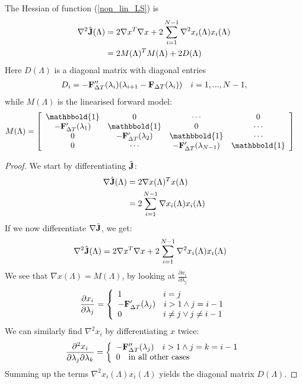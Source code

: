 \begin{proposition}\label{NonLin_prop}
The Hessian of function (\ref{non_lin_LS}) is
\begin{align*}
\nabla^2 \hat{\bold J}(\Lambda) &= 2\nabla x^T\nabla x + 2\sum_{i=1}^{N-1} \nabla^2 x_i(\Lambda) x_i(\Lambda)\\
&=2M(\Lambda)^TM(\Lambda) + 2D(\Lambda)
\end{align*}
Here $D(\Lambda)$ is a diagonal matrix with diagonal entries 
\begin{align*}
D_i=-\bold{F}_{\Delta T}''(\lambda_i)(\lambda_{i+1}-\bold F_{\Delta T}(\lambda_i)) \quad i=1,...,N-1,
\end{align*}
while $M(\Lambda)$ is the linearised forward model:
\begin{align*}
M(\Lambda) &= \left[ \begin{array}{cccc}
   \mathbbold{1} & 0 & \cdots & 0 \\  
   -\bold{F}_{\Delta T}'(\lambda_{1}) & \mathbbold{1} & 0 & \cdots \\ 
   0 &-\bold{F}_{\Delta T}'(\lambda_{2}) & \mathbbold{1}  & \cdots \\
   0 &\cdots &-\bold{F}_{\Delta T}'(\lambda_{N-1}) & \mathbbold{1}  \\
   \end{array}  \right]
\end{align*}	
\end{proposition}
\begin{proof}
We start by differentiating $\hat{\bold J}$:
\begin{align*}
\nabla \hat{\bold J}(\Lambda) &= 2 \nabla x(\Lambda)^T x(\Lambda)\\
&=2\sum_{i=1}^{N-1} \nabla x_i(\Lambda) x_i(\Lambda)
\end{align*}
If we now differentiate $\nabla \hat{\bold J}$, we get:
\begin{align*}
\nabla^2 \hat{\bold J}(\Lambda) &= 2\nabla x^T\nabla x + 2\sum_{i=1}^{N-1} \nabla^2 x_i(\Lambda) x_i(\Lambda)
\end{align*}
We see that $\nabla x(\Lambda)=M(\Lambda)$, by looking at $\frac{\partial x_i}{\partial \lambda_j}$
\begin{align*}
\frac{\partial x_i}{\partial \lambda_j} = \left\{
     \begin{array}{lr}
		1 \quad\quad\quad\quad\quad i=j\\
		-\bold F_{\Delta T}'(\lambda_{j}) \quad i>1 \wedge j=i-1 \\
		0 \quad\quad\quad\quad\quad i\neq j \vee j\neq i-1
	\end{array}
   \right.	
\end{align*}
We can similarly find $\nabla^2 x_i$ by differentiating $x$ twice:
\begin{align*}
\frac{\partial^2 x_i}{\partial \lambda_j\partial\lambda_k} = \left\{
     \begin{array}{lr}
		-\bold F_{\Delta T}''(\lambda_{j}) \quad i>1 \wedge j=k=i-1 \\
		0 \quad\textrm{in all other cases}
	\end{array}
   \right.	
\end{align*}
Summing up the terms $\nabla^2 x_i(\Lambda)x_i(\Lambda)$ yields the diagonal matrix $D(\Lambda)$.
\end{proof}
